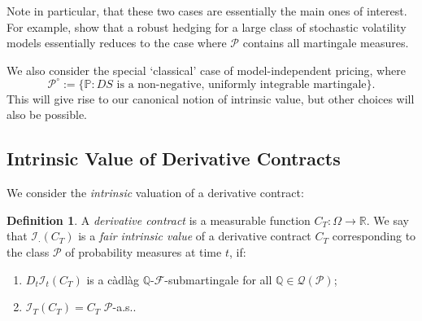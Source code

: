 \documentclass[a4paper]{amsart}
\theoremstyle{definition}
\newtheorem{definition}[theorem]{Definition}
\theoremstyle{remark}
\numberwithin{equation}{section}
\newcommand{\E}{\mathbb{E}}
\renewcommand{\P}{\mathbb{P}}
\newcommand{\Q}{\mathbb{Q}}
\newcommand{\R}{\mathbb{R}}
\newcommand{\as}{a.s.}
\newcommand{\F}{\mathcal{F}}
\newcommand{\Fc}{\mathcal{F}}
\newcommand{\Eq}[1]{\E^{\Q}\left[#1\right]}
\newcommand{\Pc}{\mathcal{P}}
\newcommand{\Pcc}{\Pc^{\circ}}
\newcommand{\Qc}{\mathcal{Q}}
\newcommand{\cadlag}{c\`adl\`ag}
\newcommand{\comment}[1]{{\color{red} \bf #1}}
\newcommand{\In}{\mathcal{I}} %
\begin{document}
Note in particular, that these two cases are essentially the main ones of interest. For example, \cite{dolinsky_super-replication_2018} show that a robust hedging for a large class of stochastic volatility models essentially reduces to the case where $\Pc$ contains all martingale measures.

We also consider the special `classical' case of model-independent pricing, where
\begin{equation}\label{def:P0}
  \Pcc := \{ \P: D S \text{ is a non-negative, uniformly integrable martingale}\}.
\end{equation}
This will give rise to our canonical notion of intrinsic value, but other choices will also be possible.

\subsection{Intrinsic Value of Derivative Contracts}

We consider the {\it intrinsic} valuation of a derivative contract:

\begin{definition} \label{def:intrinsic}
  A \emph{derivative contract} is a measurable function $C_T: \Omega \to \R$. We say that $\In_{\cdot}(C_T)$ is a \emph{fair intrinsic value} of a derivative contract $C_T$ corresponding to the class $\Pc$ of probability measures at time $t$, if:
  \begin{enumerate}
  \item $D_t\In_t(C_T)$ is a \cadlag{} $\Q$-$\F$-submartingale for all $\Q \in \Qc(\Pc)$;
  \item $\In_T(C_T) = C_T$ $\Pc$-\as{}.
  \end{enumerate}
\end{definition}
\end{document}
